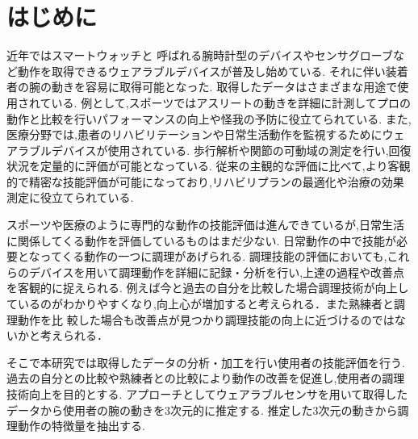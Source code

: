 \section{はじめに}
近年ではスマートウォッチと
呼ばれる腕時計型のデバイスやセンサグローブなど動作を取得できるウェアラブルデバイスが普及し始めている.
それに伴い装着者の腕の動きを容易に取得可能となった.
取得したデータはさまざまな用途で使用されている.
例として,スポーツではアスリートの動きを詳細に計測してプロの動作と比較を行いパフォーマンスの向上や怪我の予防に役立てられている.
また,医療分野では,患者のリハビリテーションや日常生活動作を監視するためにウェアラブルデバイスが使用されている.
歩行解析や関節の可動域の測定を行い,回復状況を定量的に評価が可能となっている.
従来の主観的な評価に比べて,より客観的で精密な技能評価が可能になっており,リハビリプランの最適化や治療の効果測定に役立てられている.

スポーツや医療のように専門的な動作の技能評価は進んできているが,日常生活に関係してくる動作を評価しているものはまだ少ない.
日常動作の中で技能が必要となってくる動作の一つに調理があげられる.
調理技能の評価においても,これらのデバイスを用いて調理動作を詳細に記録・分析を行い,上達の過程や改善点を客観的に捉えられる.
例えば今と過去の自分を比較した場合調理技術が向上しているのがわかりやすくなり,向上心が増加すると考えられる．また熟練者と調理動作を比
較した場合も改善点が見つかり調理技能の向上に近づけるのではないかと考えられる．

そこで本研究では取得したデータの分析・加工を行い使用者の技能評価を行う.
過去の自分との比較や熟練者との比較により動作の改善を促進し,使用者の調理技術向上を目的とする.
アプローチとしてウェアラブルセンサを用いて取得したデータから使用者の腕の動きを3次元的に推定する.
推定した3次元の動きから調理動作の特徴量を抽出する.
